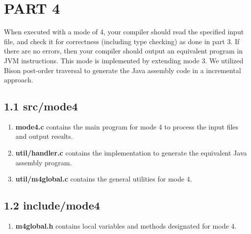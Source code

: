 \section*{PART 4}

When executed with a mode of 4, your compiler should read the specified input file, and check it for correctness (including type checking) as done in part 3. If there are no errors, then your compiler should output an equivalent program in JVM instructions. This mode is implemented by extending mode 3. We utilized Bison post-order traversal to generate the Java assembly code in a incremental approach.

\subsection*{1.1 \large\textbf{src/mode4}}
\begin{enumerate}
    
    \item \textbf{mode4.c} contains the main program for mode 4 to process the input files and output results.

    \item \textbf{util/handler.c} contains the implementation to generate the equivalent Java assembly program.

    \item \textbf{util/m4global.c} contains the general utilities for mode 4.
\end{enumerate}

\subsection*{1.2 \large\textbf{include/mode4}}
\begin{enumerate}
    \item \textbf{m4global.h} contains local variables and methods designated for mode 4.
\end{enumerate} 